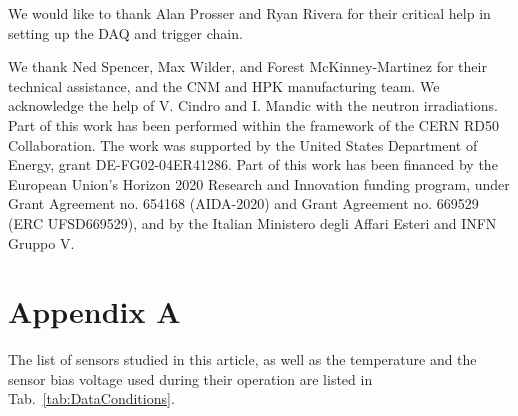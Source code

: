 \documentclass[preprint,1p]{elsarticle}
\begin{document}
We would like to thank Alan Prosser and Ryan Rivera for their critical help in
setting up the DAQ and trigger chain. 

We thank Ned Spencer, Max Wilder, and Forest McKinney-Martinez for their
technical assistance, and the CNM and HPK manufacturing team. We acknowledge the
help of V. Cindro and I. Mandic with the neutron irradiations. Part of this work
has been performed within the framework of the CERN RD50 Collaboration. The work
was supported by the United States Department of Energy, grant
DE-FG02-04ER41286. Part of this work has been financed by the European Union’s
Horizon 2020 Research and Innovation funding program, under Grant Agreement no.
654168 (AIDA-2020) and Grant Agreement no. 669529 (ERC UFSD669529), and by the
Italian Ministero degli Affari Esteri and INFN Gruppo V.




\appendix
\section{Appendix A}

The list of sensors studied in this article, as well as the temperature and the
sensor bias voltage used during their operation are listed in
Tab.~\ref{tab:DataConditions}. 
\end{document}
